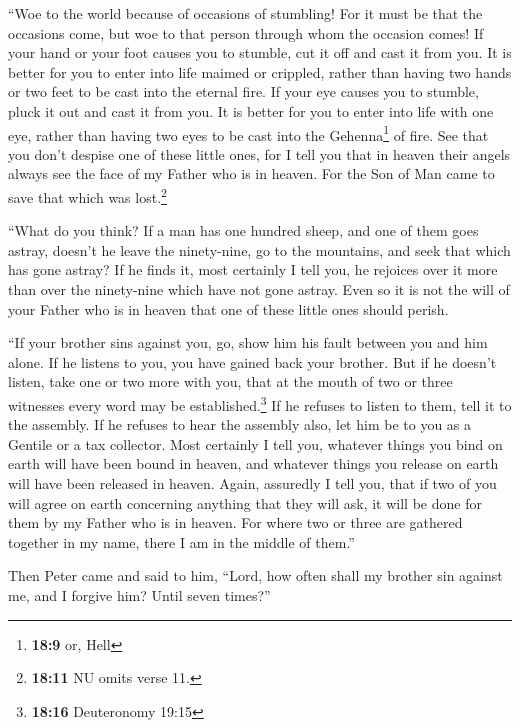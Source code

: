  ``Woe to the world because of occasions of stumbling! For
it must be that the occasions come, but woe to that person through whom
the occasion comes!  If your hand or your foot causes you
to stumble, cut it off and cast it from you. It is better for you to
enter into life maimed or crippled, rather than having two hands or two
feet to be cast into the eternal fire.  If your eye causes
you to stumble, pluck it out and cast it from you. It is better for you
to enter into life with one eye, rather than having two eyes to be cast
into the Gehenna\footnote{\textbf{18:9} or, Hell} of fire.
 See that you don't despise one of these little ones, for
I tell you that in heaven their angels always see the face of my Father
who is in heaven.  For the Son of Man came to save that
which was lost.\footnote{\textbf{18:11} NU omits verse 11.}

 ``What do you think? If a man has one hundred sheep, and
one of them goes astray, doesn't he leave the ninety-nine, go to the
mountains, and seek that which has gone astray?  If he
finds it, most certainly I tell you, he rejoices over it more than over
the ninety-nine which have not gone astray.  Even so it
is not the will of your Father who is in heaven that one of these little
ones should perish.

 ``If your brother sins against you, go, show him his
fault between you and him alone. If he listens to you, you have gained
back your brother.  But if he doesn't listen, take one or
two more with you, that at the mouth of two or three witnesses every
word may be established.\footnote{\textbf{18:16} Deuteronomy 19:15}
 If he refuses to listen to them, tell it to the
assembly. If he refuses to hear the assembly also, let him be to you as
a Gentile or a tax collector.  Most certainly I tell you,
whatever things you bind on earth will have been bound in heaven, and
whatever things you release on earth will have been released in heaven.
 Again, assuredly I tell you, that if two of you will
agree on earth concerning anything that they will ask, it will be done
for them by my Father who is in heaven.  For where two or
three are gathered together in my name, there I am in the middle of
them.''

 Then Peter came and said to him, ``Lord, how often shall
my brother sin against me, and I forgive him? Until seven times?''

